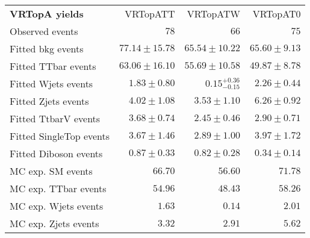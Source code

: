 

\begin{table}
\begin{center}
\setlength{\tabcolsep}{0.0pc}
{\small
\begin{tabular*}{\textwidth}{@{\extracolsep{\fill}}lrrr}
\noalign{\smallskip}\hline\noalign{\smallskip}
{\bf VRTopA yields}           & VRTopATT            & VRTopATW            & VRTopAT0              \\[-0.05cm]
\noalign{\smallskip}\hline\noalign{\smallskip}
Observed events          & $78$              & $66$              & $75$                    \\
\noalign{\smallskip}\hline\noalign{\smallskip}
Fitted bkg events         & $77.14 \pm 15.78$          & $65.54 \pm 10.22$          & $65.60 \pm 9.13$              \\
\noalign{\smallskip}\hline\noalign{\smallskip}
        Fitted TTbar events         & $63.06 \pm 16.10$          & $55.69 \pm 10.58$          & $49.87 \pm 8.78$              \\
        Fitted Wjets events         & $1.83 \pm 0.80$          & $0.15_{-0.15}^{+0.36}$          & $2.26 \pm 0.44$              \\
        Fitted Zjets events         & $4.02 \pm 1.08$          & $3.53 \pm 1.10$          & $6.26 \pm 0.92$              \\
        Fitted TtbarV events         & $3.68 \pm 0.74$          & $2.45 \pm 0.46$          & $2.90 \pm 0.71$              \\
        Fitted SingleTop events         & $3.67 \pm 1.46$          & $2.89 \pm 1.00$          & $3.97 \pm 1.72$              \\
        Fitted Diboson events         & $0.87 \pm 0.33$          & $0.82 \pm 0.28$          & $0.34 \pm 0.14$              \\
 \noalign{\smallskip}\hline\noalign{\smallskip}
MC exp. SM events              & $66.70$          & $56.60$          & $71.78$              \\
\noalign{\smallskip}\hline\noalign{\smallskip}
        MC exp. TTbar events         & $54.96$          & $48.43$          & $58.26$              \\
        MC exp. Wjets events         & $1.63$          & $0.14$          & $2.01$              \\
        MC exp. Zjets events         & $3.32$          & $2.91$          & $5.62$              \\

\end{tabular*}}
\end{center}
\end{table}
